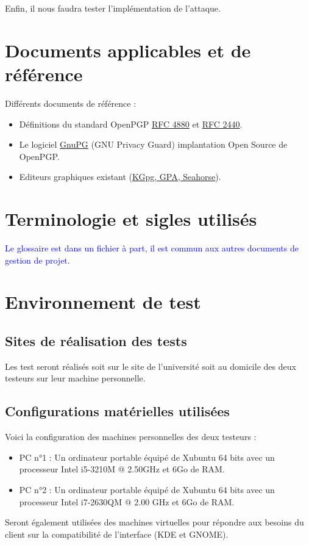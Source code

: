 \documentclass{../res/univ-projet}
\begin{document}
Enfin, il nous faudra tester l'implémentation de l'attaque. 


\section{Documents applicables et de référence}
Différents documents de référence :
\begin{itemize}
\item Définitions du standard OpenPGP \href{file:../../ressources/openPGP/rfc4880-en.pdf}{RFC 4880}
  et \href{file:../../ressources/openPGP/rfc2440-fr.pdf}{RFC 2440}.
\item Le logiciel \href{https://www.gnupg.org/}{GnuPG} (GNU Privacy Guard) implantation Open Source
  de OpenPGP.
\item Editeurs graphiques existant
  (\href{http://www.gnupg.org/related_software/frontends.en.html}{KGpg, GPA, Seahorse}).
\end{itemize}

\section{Terminologie et sigles utilisés}
\textcolor{blue}{
  Le glossaire est dans un fichier à part, il est commun aux autres documents de gestion de projet.
}

\section{Environnement de test}
\subsection{Sites de réalisation des tests}
Les test seront réalisés soit sur le site de l'université soit au domicile des deux testeurs sur leur machine personnelle.



\subsection{Configurations matérielles utilisées}
Voici la configuration des machines personnelles des deux testeurs :
\begin{itemize}
 \item PC n°1 : Un ordinateur portable équipé de Xubuntu 64 bits avec un processeur Intel i5-3210M @ 2.50GHz et 6Go de RAM.
 \item PC n°2 : Un ordinateur portable équipé de Xubuntu 64 bits avec un processeur Intel i7-2630QM @ 2.00 GHz et 6Go de RAM.
\end{itemize}
Seront également utilisées des machines virtuelles pour répondre aux besoins du client sur la compatibilité de l'interface (KDE et GNOME).
\end{document}
